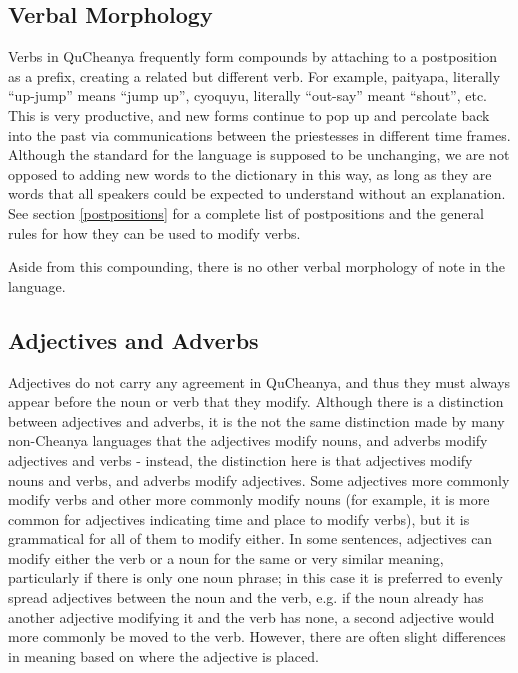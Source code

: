 \documentclass{article}
\begin{document}
\subsection{Verbal Morphology}

Verbs in QuCheanya frequently form compounds by attaching to a postposition as a prefix, creating a related but different verb.  For example, {\quch paityapa}, literally ``up-jump'' means ``jump up'', {\quch cyoquyu}, literally ``out-say'' meant ``shout'', etc.  This is very productive, and new forms continue to pop up and percolate back into the past via communications between the priestesses in different time frames.  Although the standard for the language is supposed to be unchanging, we are not opposed to adding new words to the dictionary in this way, as long as they are words that all speakers could be expected to understand without an explanation. See section \ref{postpositions} for a complete list of postpositions and the general rules for how they can be used to modify verbs.

Aside from this compounding, there is no other verbal morphology of note in the language.

\subsection{Adjectives and Adverbs}

Adjectives do not carry any agreement in QuCheanya, and thus they must always appear before the noun or verb that they modify. Although there is a distinction between adjectives and adverbs, it is the not the same distinction made by many non-Cheanya languages that the adjectives modify nouns, and adverbs modify adjectives and verbs - instead, the distinction here is that adjectives modify nouns and verbs, and adverbs modify adjectives. Some adjectives more commonly modify verbs and other more commonly modify nouns (for example, it is more common for adjectives indicating time and place to modify verbs), but it is grammatical for all of them to modify either.  In some sentences, adjectives can modify either the verb or a noun for the same or very similar meaning, particularly if there is only one noun phrase; in this case it is preferred to evenly spread adjectives between the noun and the verb, e.g. if the noun already has another adjective modifying it and the verb has none, a second adjective would more commonly be moved to the verb. However, there are often slight differences in meaning based on where the adjective is placed.
\end{document}
